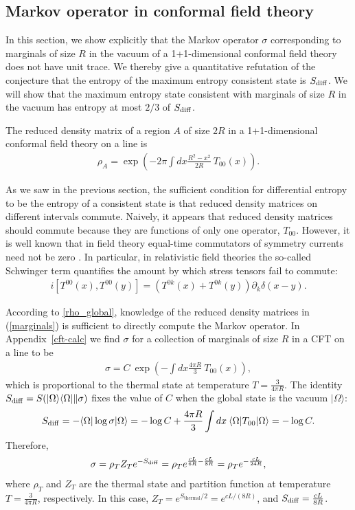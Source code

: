 \documentclass[12pt]{article}
\newcommand{\la}{\langle}
\newcommand{\ra}{\rangle}
\newcommand{\rb}{\right)}
\newcommand{\lb}{\left(}
\def\bea{\begin{eqnarray}}
\def\eea{\end{eqnarray}}
\def\sdiff{S_{\rm diff}}
\newcommand{\appref}[1]{Appendix~\ref{#1}}
\begin{document}
\subsection{Markov operator in conformal field theory}

In this section, we show explicitly that the Markov operator $\sigma$ corresponding to marginals of size $R$ in the vacuum of a 1+1-dimensional conformal field theory does not have unit trace. We thereby give a quantitative refutation of the conjecture that the entropy of the maximum entropy consistent state is $\sdiff$. We will show that the maximum entropy state consistent with marginals of size $R$ in the vacuum has entropy at most $2/3$ of $\sdiff$.

The reduced density matrix of a region $A$ of size $2R$ in a 1+1-dimensional conformal field theory on a line is \cite{casini2011towards}
\bea\label{marginals}
\rho_A=\exp\lb -2\pi\int dx \frac{R^2-x^2}{2R}\:T_{00}(x)\rb.
\eea

As we saw in the previous section, the sufficient condition for differential entropy to be the entropy of a consistent state is that reduced density matrices on different intervals commute. Naively, it appears that reduced density matrices should commute because they are functions of only one operator, $T_{00}$. However, it is well known that in field theory equal-time commutators of symmetry currents need not be zero \cite{schwinger1963commutation}. In particular, in relativistic field theories the so-called Schwinger term quantifies the amount by which stress tensors fail to commute:
\bea
i[T^{00}(x),T^{00}(y)]=\lb T^{0k}(x)+T^{0k}(y)\rb \partial_k \delta(x-y).
\eea

According to \eqref{rho_global}, knowledge of the reduced density matrices in (\ref{marginals}) is sufficient to directly compute the Markov operator. In \appref{cft-calc} we find $\sigma$ for a collection of marginals of size $R$ in a CFT on a line to be
\bea
\sigma=C\: \exp\lb-\int dx \frac{4\pi R}{3}\: T_{00}(x)\rb,
\eea
which is proportional to the thermal state at temperature $T=\frac{3}{4\pi R}$.
The identity $\sdiff=S(|\Omega\ra\la\Omega|\|\sigma)$ fixes the value of $C$ when the global state is the vacuum $|\Omega\ra$:
\bea
\sdiff=-\la\Omega|\log\sigma|\Omega\ra=-\log C+\frac{4\pi R}{3}\int dx\:\la\Omega| T_{00}|\Omega\ra=-\log C.
\eea
Therefore,
\bea
\sigma=\rho_T Z_T e^{-\sdiff}= \rho_T e^{\frac{c L}{6 R}-\frac{c L}{8 R}}=\rho_T e^{-\frac{c L}{24 R}},
\eea
where $\rho_T$ and $Z_T$ are the thermal state and partition function at temperature $T=\frac{3}{4\pi R}$, respectively. In this case, $Z_T=e^{S_{\operatorname{thermal}}/2}=e^{c L/ (8 R)}$, and $\sdiff=\frac{c L}{8 R}$.
\end{document}
